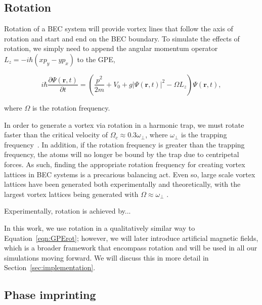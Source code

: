 \subsection{Rotation}

\label{sec:rot}
Rotation of a BEC system will provide vortex lines that follow the axis of rotation and start and end on the BEC boundary.
To simulate the effects of rotation, we simply need to append the angular momentum operator $L_z = -i\hbar(xp_y - yp_x)$ to the GPE,

\begin{equation}
i \hbar \frac{\partial \Psi(\mathbf{r},t)}{\partial t} = \left(\frac{p^2}{2m} + V_0 + g |\Psi(\mathbf{r},t)|^2 -\Omega L_z \right)\Psi(\mathbf{r},t),
\label{eqn:GPErot}
\end{equation}

\noindent where $\Omega$ is the rotation frequency. 

In order to generate a vortex via rotation in a harmonic trap, we must rotate faster than the critical velocity of $\Omega_c \approx 0.3 \omega_\perp$, where $\omega_\perp$ is the trapping frequency~.
In addition, if the rotation frequency is greater than the trapping frequency, the atoms will no longer be bound by the trap due to centripetal forces.
As such, finding the appropriate rotation frequency for creating vortex lattices in BEC systems is a precarious balancing act.
Even so, large scale vortex lattices have been generated both experimentally and theoretically, with the largest vortex lattices being generated with $\Omega \approx \omega_\perp$ \cite{o2016, o2016topo, abo2001, schweikhard2004}.

Experimentally, rotation is achieved by...

In this work, we use rotation in a qualitatively similar way to Equation~\eqref{eqn:GPErot}; however, we will later introduce artificial magnetic fields, which is a broader framework that encompass rotation and will be used in all our simulations moving forward.
We will discuss this in more detail in Section~\ref{sec:implementation}.

\subsection{Phase imprinting}

